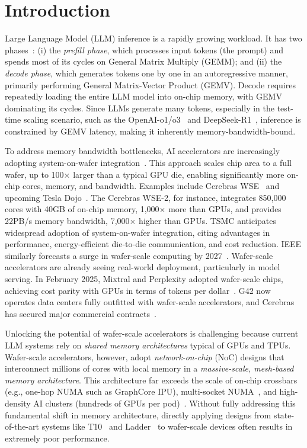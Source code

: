 \section{Introduction}
\vspace{-0.3cm}

Large Language Model (LLM) inference is a rapidly growing workload. It has two phases~\cite{flashdecoding++}: (i) the \textit{prefill phase}, which processes input tokens (the prompt) and spends most of its cycles on General Matrix Multiply (GEMM); and (ii) the \textit{decode phase}, which generates tokens one by one in an autoregressive manner, primarily performing General Matrix-Vector Product (GEMV). Decode requires repeatedly loading the entire LLM model into on-chip memory, with GEMV dominating its cycles. Since LLMs generate many tokens, especially in the test-time scaling scenario, such as the OpenAI-o1/o3~\cite{openaio1,openaio3} and DeepSeek-R1~\cite{deepseekr1}, inference is constrained by GEMV latency, making it inherently memory-bandwidth-bound.

To address memory bandwidth bottlenecks, AI accelerators are increasingly adopting system-on-wafer integration~\cite{tsmc-advanced-packaging}. This approach scales chip area to a full wafer, up to 100$\times$ larger than a typical GPU die, enabling significantly more on-chip cores, memory, and bandwidth. Examples include Cerebras WSE~\cite{wse} and upcoming Tesla Dojo~\cite{dojo}. The Cerebras WSE-2, for instance, integrates 850,000 cores with 40GB of on-chip memory, 1,000$\times$ more than GPUs, and provides 22PB/s memory bandwidth, 7,000$\times$ higher than GPUs. TSMC anticipates widespread adoption of system-on-wafer integration, citing advantages in performance, energy-efficient die-to-die communication, and cost reduction. IEEE similarly forecasts a surge in wafer-scale computing by 2027~\cite{tsmc-advanced-packaging}. Wafer-scale accelerators are already seeing real-world deployment, particularly in model serving. In February 2025, Mixtral and Perplexity adopted wafer-scale chips, achieving cost parity with GPUs in terms of tokens per dollar~\cite{perplexity,mistra}. G42 now operates data centers fully outfitted with wafer-scale accelerators, and Cerebras has secured major commercial contracts~\cite{g42}.

Unlocking the potential of wafer-scale accelerators is challenging because current LLM systems rely on \emph{shared memory architectures} typical of GPUs and TPUs. Wafer-scale accelerators, however, adopt \emph{network-on-chip} (NoC) designs that interconnect millions of cores with local memory in a \emph{massive-scale, mesh-based memory architecture}. This architecture far exceeds the scale of on-chip crossbars (e.g., one-hop NUMA such as GraphCore IPU), multi-socket NUMA~\cite{amd2023numa}, and high-density AI clusters (hundreds of GPUs per pod)~\cite{tpu}. Without fully addressing this fundamental shift in memory architecture, directly applying designs from state-of-the-art systems like T10~\cite{t10} and Ladder~\cite{ladder} to wafer-scale devices often results in extremely poor performance.

